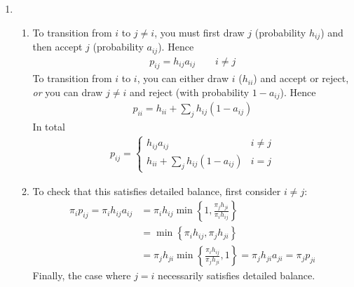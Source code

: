 \documentclass[12pt]{article}
\theoremstyle{plain}
\theoremstyle{definition}
\theoremstyle{remark}
\begin{document}
\begin{enumerate}
\begin{enumerate}
    \item %
      
  \end{enumerate}
  

\item %
  \begin{enumerate}
    \item %
      To transition from $i$ to $j\neq i$, you must first draw $j$ (probability
      $h_{ij}$) and then accept $j$ (probability $a_{ij}$). Hence
      \begin{align*}
        p_{ij} = h_{ij}a_{ij} \qquad i\neq j 
      \end{align*}
      To transition from $i$ to $i$, you can either draw $i$ ($h_{ii}$) and
      accept or reject, \emph{or} you can draw $j\neq i$ and reject (with
      probability $1-a_{ij}$). Hence
      \begin{align*}
        p_{ii} = h_{ii} + \sum_j h_{ij}(1-a_{ij})
      \end{align*}
      In total
      \begin{align*}
        p_{ij} = 
          \begin{cases}
            h_{ij}a_{ij}                     & i\neq j \\
            h_{ii} + \sum_j h_{ij}(1-a_{ij}) & i= j 
          \end{cases}
      \end{align*}

    \item %
      To check that this satisfies detailed balance, first consider $i\neq j$:
      \begin{align*}
        \pi_i p_{ij} = 
          \pi_i h_{ij}a_{ij} 
          &= \pi_i h_{ij}\min\left\{1, \frac{\pi_j h_{ji}}{\pi_ih_{ij}}\right\}\\
          &= \min\left\{\pi_i h_{ij}, \pi_j h_{ji}\right\} \\
          &= \pi_j h_{ji}\min\left\{ \frac{\pi_i h_{ij}}{\pi_j h_{ji}}, 1\right\} 
          = \pi_j h_{ji}a_{ji} = \pi_j p_{ji}
      \end{align*}
      Finally, the case where $j=i$ necessarily satisfies detailed balance.


\end{enumerate}
\end{enumerate}
\end{document}
